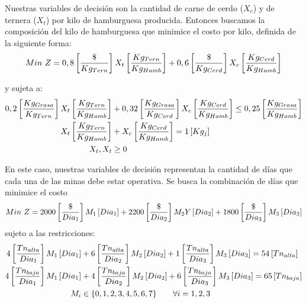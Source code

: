 \documentclass{tarea}
\begin{document}
\begin{homeworkProblem}[-1][Carnicería]
%
Nuestras variables de decisión son la cantidad de carne de cerdo ($X_c$) y de ternera ($X_t$) por kilo de hamburguesa producida. Entonces buscamos la composición del kilo de hamburguesa que minimice el costo por kilo, definida de la siguiente forma:
\begin{equation}
Min\ Z=0,8\fraccorche{\$}{Kg_{Tern}}X_t\fraccorche{Kg_{Tern}}{Kg_{Hamb}} + 0,6\fraccorche{\$}{Kg_{Cerd}}   X_c\fraccorche{Kg_{Cerd}}{Kg_{Hamb}}
\end{equation}

y sujeta a:
\begin{align*}
0,2 \left[ \frac{Kg_{Grasa}}{Kg_{Tern}} \right] X_t\left[ \frac{Kg_{Tern}}{Kg_{Hamb}} \right] &+ 0,32\left[ \frac{Kg_{Grasa}}{Kg_{Cerd}} \right] X_c\left[ \frac{Kg_{Cerd}}{Kg_{Hamb}} \right]  \le 0,25\left[ \frac{Kg_{Grasa}}{Kg_{Hamb}} \right] \\
X_t\left[ \frac{Kg_{Tern}}{Kg_{Hamb}} \right]&+X_c\left[ \frac{Kg_{Cerd}}{{Kg_{Hamb}}} \right] = 1\left[ Kg_j \right] \\
X_t,X_t &\ge 0
\end{align*}

\end{homeworkProblem}


\begin{homeworkProblem}
En este caso, nuestras variables de decisión representan la cantidad de días que cada una de las minas debe estar operativa. 
Se busca la combinación de días que minimice el costo
\begin{equation}
Min\ Z = 2000\left[ \frac{\$}{Dia_{1}} \right]M_1\left[ Dia_{1} \right] + 2200\left[ \frac{\$}{Dia_{2}} \right]M_2Y\left[ Dia_{2} \right] + 1800\left[ \frac{\$}{Dia_{3}} \right]M_3\left[ Dia_{3} \right]
\end{equation}
sujeto a las restricciones:
\begin{align*}
4\left[ \frac{Tn_{alta}}{Dia_1} \right]M_1\left[ Dia_1 \right]&+6\left[ \frac{Tn_{alta}}{Dia_2} \right]M_2\left[ Dia_2 \right]+1\left[ \frac{Tn_{alta}}{Dia_3} \right]M_3\left[ Dia_3 \right] = 54\left[ Tn_{alta} \right] \\
4\left[ \frac{Tn_{baja}}{Dia_1} \right]M_1\left[ Dia_1 \right]&+4\left[ \frac{Tn_{baja}}{Dia_2} \right]M_2\left[ Dia_2 \right]+6\left[ \frac{Tn_{baja}}{Dia_3} \right]M_3\left[ Dia_3 \right] = 65\left[ Tn_{baja} \right] \\
M_i &\in \{0,1,2,3,4,5,6,7\}\quad \quad \forall i=1,2,3 
\end{align*}
\end{homeworkProblem}
\end{document}
